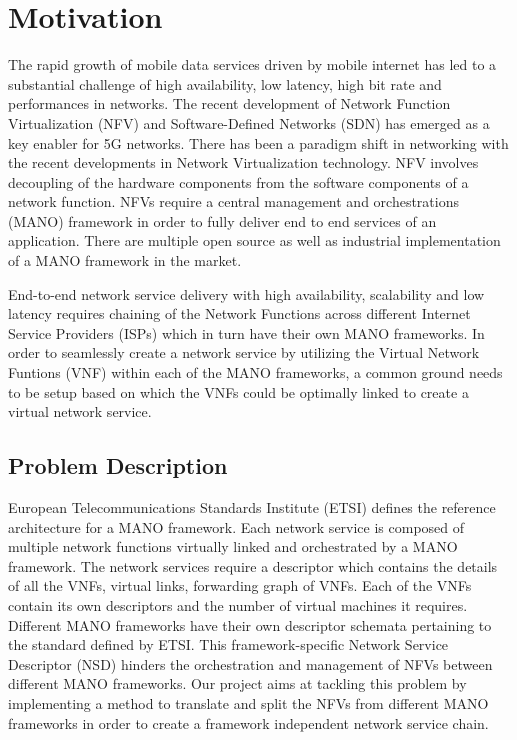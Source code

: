 \chapter{Motivation}
\label{ch:Motivation}


The rapid growth of mobile data services driven by mobile internet has led to a substantial challenge of high availability, low latency, high bit rate and performances in networks. The recent development of Network Function Virtualization (NFV) and Software-Defined Networks (SDN) has emerged as a key enabler for 5G networks. 
There has been a paradigm shift in networking with the recent developments in Network Virtualization technology. NFV involves decoupling of the hardware components from the software components of a network function. NFVs require a central management and orchestrations (MANO) framework  in order to fully deliver end to end services of an application. There are multiple open source as well as industrial implementation of a  MANO framework in the market. 

End-to-end network service delivery with high availability, scalability and low latency requires chaining of the Network Functions across different Internet Service Providers (ISPs) which in turn have their own MANO frameworks. In order to seamlessly create a network service by utilizing the Virtual Network Funtions (VNF) within each of the MANO frameworks, a common ground needs to be setup based on which the VNFs could be optimally linked to create a virtual network service.


\section{Problem Description}

European Telecommunications Standards Institute (ETSI) defines the reference architecture for a MANO framework. Each network service is composed of multiple network functions virtually linked and orchestrated by a MANO framework. The network services require a descriptor which contains the details of all the VNFs, virtual links, forwarding graph of VNFs. Each of the VNFs contain its own descriptors and the number of virtual machines it requires. Different MANO frameworks have their own descriptor schemata pertaining to the standard defined by ETSI. This framework-specific Network Service Descriptor (NSD) hinders the orchestration and management of NFVs between different MANO frameworks. Our project aims at tackling this problem by implementing a method to translate and split the NFVs from different MANO frameworks in order to create a framework independent network service chain.


